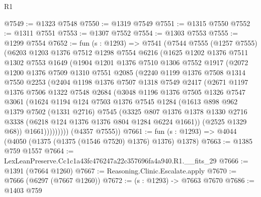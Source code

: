 \begin{lexlean}{R1}
\begin{coremodule}
@7549 := @1323 @7548
@7550 := @1319 @7549
@7551 := @1315 @7550
@7552 := @1311 @7551
@7553 := @1307 @7552
@7554 := @1303 @7553
@7555 := @1299 @7554
@7652 := fun (s : @1293) =>
  @7541
    (@7544
      @7555
      (@1257 @7555)
      (@6203
        @1203
        @1376
        @7512
        @1298
        @7554
        @6216
        (@1625
          @1202
          @1376
          @7511
          @1302
          @7553
          @1649
          (@1904
            @1201
            @1376
            @7510
            @1306
            @7552
            @1917
            (@2072
              @1200
              @1376
              @7509
              @1310
              @7551
              @2085
              (@2240
                @1199
                @1376
                @7508
                @1314
                @7550
                @2253
                (@2404
                  @1198
                  @1376
                  @7507
                  @1318
                  @7549
                  @2417
                  (@2671
                    @1197
                    @1376
                    @7506
                    @1322
                    @7548
                    @2684
                    (@3048
                      @1196
                      @1376
                      @7505
                      @1326
                      @7547
                      @3061
                      (@1624
                        @1194
                        @124
                        @7503
                        @1376
                        @7545
                        @1284
                        (@1613
                          @898
                          @962
                          @1379
                          @7502
                          (@1331 @2716)
                          @7545
                          (@3325
                            @807
                            @1376
                            @1378
                            @1330
                            @2716
                            @3338
                            (@6218 @124 @1376 @1376 @804 @1284 @6224 @1661))
                          (@2525 @1329 @68))
                        @1661)))))))))
      (@4357 @7555))
@7661 := fun (s : @1293) => @4044 (@4050 (@1375 (@1375 (@1546 @7520) @1376) @1376) @1378)
@7663 := @1385 @759 @1557
@7664 := LexLeanPreserve.Cc1c1a43fc476247a22c357696fa4a940.R1.__fits_29
@7666 := @1391 (@7664 @1260)
@7667 := Reasoning.Clinic.Escalate.apply
@7670 := @7666 (@6297 (@7667 @1260))
@7672 := (s : @1293) -> @7663 @7670
@7686 := @1403
    @759

\end{coremodule}
\end{lexlean}
